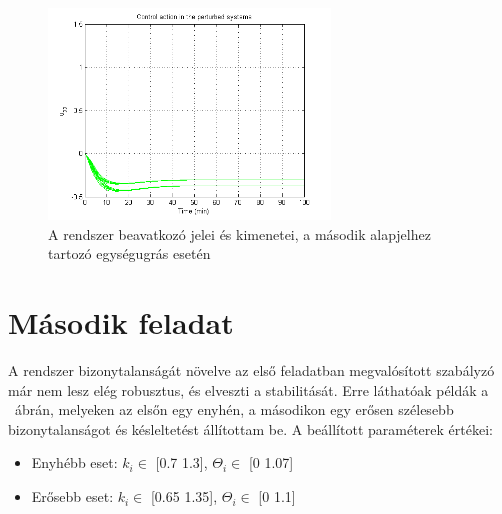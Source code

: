 \begin{figure}[!ht]
	\includegraphics[width=75mm,keepaspectratio]{figures/2m06/prt_old_8.png}
		\caption{A rendszer beavatkozó jelei és kimenetei, a második alapjelhez tartozó egységugrás esetén}
	\label{fig:PrtOld2}
\end{figure}

\newpage
\section{Második feladat}

A rendszer bizonytalanságát növelve az első feladatban megvalósított szabályzó már nem lesz elég robusztus, és elveszti a stabilitását. Erre láthatóak példák a ~ábrán, melyeken az elsőn egy enyhén, a másodikon egy erősen szélesebb bizonytalanságot és késleltetést állítottam be.
A beállított paraméterek értékei:
\begin{itemize}
	\item Enyhébb eset: {$k_i \in$ [0.7 1.3], $\Theta_i \in$ [0 1.07]}
	\item Erősebb eset: {$k_i \in$ [0.65 1.35], $\Theta_i \in$ [0 1.1]}
\end{itemize}

